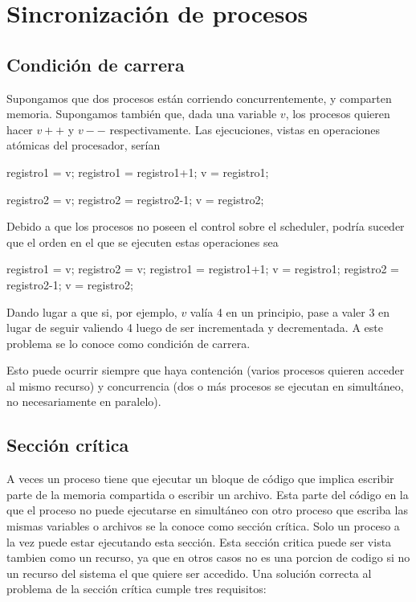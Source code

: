 \documentclass{article}
\begin{document}
\section{Sincronizaci\'on de procesos}

\subsection{Condici\'on de carrera}

Supongamos que dos procesos est\'an corriendo concurrentemente, y comparten memoria. Supongamos tambi\'en que, dada una variable $v$, los procesos quieren hacer $v++$ y $v--$ respectivamente. Las ejecuciones, vistas en operaciones at\'omicas del procesador, ser\'ian

\begin{code}
registro1 = v;
registro1 = registro1+1;
v = registro1;
\end{code}

\begin{code}
registro2 = v;
registro2 = registro2-1;
v = registro2;
\end{code}

Debido a que los procesos no poseen el control sobre el scheduler, podr\'ia suceder que el orden en el que se ejecuten estas operaciones sea

\begin{code}
registro1 = v;
registro2 = v;
registro1 = registro1+1;
v = registro1;
registro2 = registro2-1;
v = registro2;
\end{code}

Dando lugar a que si, por ejemplo, $v$ val\'ia 4 en un principio, pase a valer 3 en lugar de seguir valiendo 4 luego de ser incrementada y decrementada. A este problema se lo conoce como condici\'on de carrera.

Esto puede ocurrir siempre que haya contenci\'on (varios procesos quieren acceder al mismo recurso) y concurrencia (dos o m\'as procesos se ejecutan en simult\'aneo, no necesariamente en paralelo).

\subsection{Secci\'on cr\'itica}

A veces un proceso tiene que ejecutar un bloque de c\'odigo que implica escribir parte de la memoria compartida o escribir un archivo. Esta parte del c\'odigo en la que el proceso no puede ejecutarse en simult\'aneo con otro proceso que escriba las mismas variables o archivos se la conoce como secci\'on cr\'itica. Solo un proceso a la vez puede estar ejecutando esta sección. Esta sección critica puede ser vista tambien como un recurso, ya que en otros casos no es una porcion de codigo si no un recurso del sistema el que quiere ser accedido. Una soluci\'on correcta al problema de la secci\'on cr\'itica cumple tres requisitos:
\end{document}
